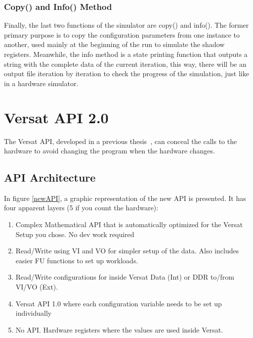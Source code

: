 \documentclass[conference]{IEEEtran}
\begin{document}
\subsubsection{Copy() and Info() Method}

Finally, the last two functions of the simulator are copy() and info(). The former primary purpose is to copy the configuration parameters from one instance to another,
used mainly at the beginning of the run to simulate the shadow registers.
Meanwhile, the info method is a state printing function that outputs a string with the complete data of the current iteration,
this way, there will be an output file iteration by iteration to check the progress of the simulation, just like in a hardware simulator.

% 






\section{Versat API 2.0}
\label{chapter:API}

The Versat API, developed in a previous thesis~\cite{valter:deepversat}, can conceal
the calls to the hardware to avoid changing the program when the hardware changes.

% 

\subsection{API Architecture}

In figure \ref{newAPI}, a graphic representation of the new API is presented. It has four apparent layers (5 if you count the hardware):

\begin{enumerate}
	\item Complex Mathematical API that is automatically optimized for the Versat Setup you chose. No dev work required
	\item Read/Write using VI and VO for simpler setup of the data. Also includes easier FU functions to set up workloads.
	\item Read/Write configurations for inside Versat Data (Int) or DDR to/from VI/VO (Ext).
	\item Versat API 1.0 where each configuration variable needs to be set up individually
	\item No API. Hardware registers where the values are used inside Versat. 
  \end{enumerate}
\end{document}
